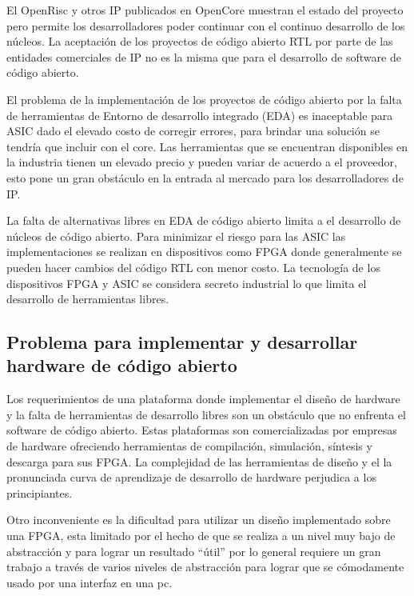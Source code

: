 El OpenRisc y otros IP publicados en OpenCore muestran el estado del
proyecto pero permite los desarrolladores poder continuar con el
continuo desarrollo de los núcleos. La aceptación de los proyectos de
código abierto RTL por parte de las entidades comerciales de IP no es
la misma que para el desarrollo de software de código abierto.

El problema de la implementación de los proyectos de código abierto
por la falta de herramientas de Entorno de desarrollo integrado (EDA)
es inaceptable para ASIC dado el elevado costo de corregir errores,
para brindar una solución se tendría que incluir con el core. Las
herramientas que se encuentran disponibles en la industria tienen un
elevado precio y pueden variar de acuerdo a el proveedor, esto pone un
gran obstáculo en la entrada al mercado para los desarrolladores de
IP.

La falta de alternativas libres en EDA de código abierto limita a el
desarrollo de núcleos de código abierto. Para minimizar el riesgo para
las ASIC las implementaciones se realizan en dispositivos como FPGA
donde generalmente se pueden hacer cambios del código RTL con menor
costo. La tecnología de los dispositivos FPGA y ASIC se considera
secreto industrial lo que limita el desarrollo de herramientas libres.

\subsection{Problema para implementar y desarrollar hardware de código abierto}

Los requerimientos de una plataforma donde implementar el diseño de
hardware y la falta de herramientas de desarrollo libres son un
obstáculo que no enfrenta el software de código abierto. Estas
plataformas son comercializadas por empresas de hardware ofreciendo
herramientas de compilación, simulación, síntesis y descarga para sus
FPGA. La complejidad de las herramientas de diseño y el la pronunciada
curva de aprendizaje de desarrollo de hardware perjudica a los
principiantes.

Otro inconveniente es la dificultad para utilizar un diseño
implementado sobre una FPGA, esta limitado por el hecho de que se
realiza a un nivel muy bajo de abstracción y para lograr un resultado
``útil'' por lo general requiere un gran trabajo a través de varios
niveles de abstracción para lograr que se cómodamente usado por una
interfaz en una pc.

